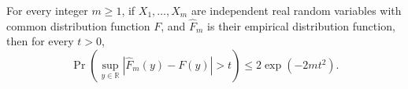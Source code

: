 For every integer \(m\ge1\), if \(X_1,\ldots,X_m\) are independent real random variables with common distribution function \(F\), and \(\widehat F_m\) is their empirical distribution function, then for every \(t>0\),
\[
 \Pr\left(\sup_{y\in\mathbb R}|\widehat F_m(y)-F(y)|>t\right)\le2\exp(-2mt^2).
\]